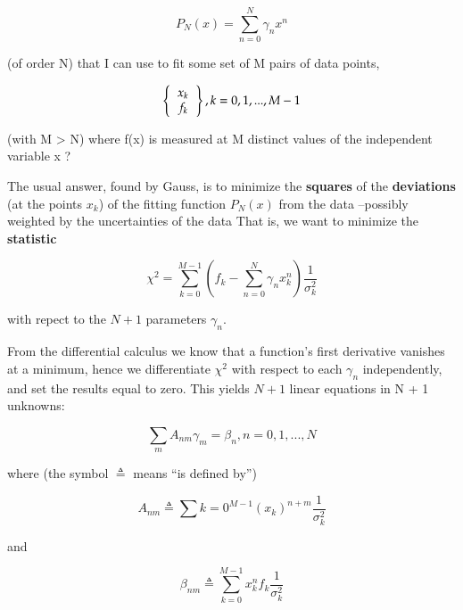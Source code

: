 \begin{equation}
P_N(x) = \sum_{n=0}^N \gamma_n x^n
\end{equation}

(of order N) that I can use to fit some set of M pairs of data points,

\begin{equation}
    \left \{
      \begin{tabular}{c}
      $x_{k}$ \\
      $f_{k}$
      \end{tabular}
    \right \}
    , k=0,1, ... , M-1
\end{equation}

(with M > N) where f(x) is measured at M distinct values of the independent variable x ?

The usual answer, found by Gauss, is to minimize the \textbf{squares} of the \textbf{deviations} (at the points $x_k$) of the fitting function $P_N(x)$ from the data --possibly weighted by the uncertainties of the data That is, we want to minimize the \textbf{statistic}

\begin{equation}
\chi^2 = \sum_{k=0}^{M-1} \left( f_k - \sum_{n=0}^{N} \gamma_n x_{k}^n \right) \frac{1}{\sigma_{k}^{2}}
\end{equation}

with repect to the $N + 1$ parameters $\gamma_{n}$.

From the differential calculus we know that a function's first derivative vanishes at a minimum, hence we differentiate $\chi^{2}$ with respect to each $\gamma_{n}$ independently, and set the results equal to zero. This yields $N + 1$ linear equations in N + 1 unknowns:

\begin{equation}
\sum_{m} A_{nm} \gamma_{m} = \beta_{n}, n = 0, 1, ... , N
\end{equation}

where (the symbol $\triangleq$ means “is defined by”)

\begin{equation}
A_{nm} \triangleq \sum{k=0}^{M-1}(x_{k})^{n+m} \frac{1}{\sigma_{k}^{2}}
\end{equation}

and

\begin{equation}
\beta_{nm} \triangleq \sum_{k=0}^{M-1}x_{k}^{n}f_{k}\frac{1}{\sigma_{k}^{2}}
\end{equation}

